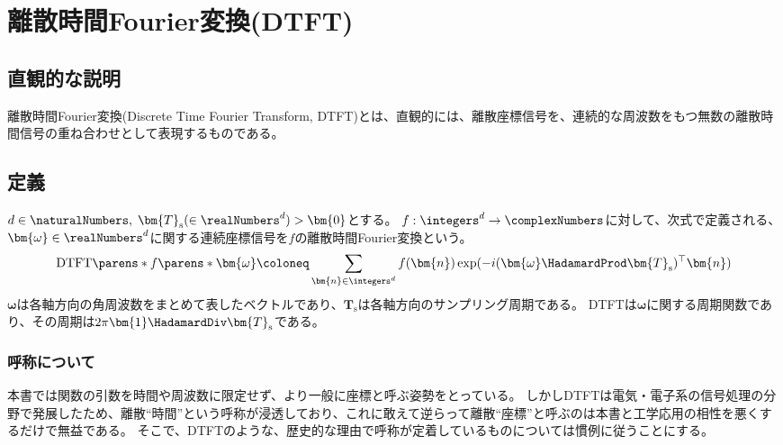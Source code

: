 \chapter{離散時間Fourier変換(DTFT)}
    \newcommand{\Ts}{T_\text{s}}
    \newcommand{\DTFT}[1]{\mathrm{DTFT}\parens*{#1}}
    \newcommand{\DTFTwithArg}[2]{\DTFT{#1}\parens*{#2}}
    \newcommand{\IDTFT}[1]{\mathrm{IDTFT}\parens*{#1}}
    \newcommand{\IDTFTwithArg}[2]{\IDTFT{#1}\parens*{#2}}
    \section{直観的な説明}
        離散時間Fourier変換(Discrete Time Fourier Transform, DTFT)とは、直観的には、離散座標信号を、連続的な周波数をもつ無数の離散時間信号の重ね合わせとして表現するものである。
    \section{定義}
        $d\in\naturalNumbers,\;\bm{T}_\text{s}(\in\realNumbers^d)>\bm{0}$とする。
        $f:\integers^d\to\complexNumbers$に対して、次式で定義される、$\bm{\omega}\in\realNumbers^d$に関する連続座標信号を$f$の離散時間Fourier変換という。
        \[ \DTFTwithArg{f}{\bm{\omega}} \coloneq \sum_{\bm{n}\in\integers^d} f(\bm{n})\exp(-i(\bm{\omega}\HadamardProd\bm{T}_\text{s})^\top\bm{n}) \]
        $\bm{\omega}$は各軸方向の角周波数をまとめて表したベクトルであり、$\bm{T}_\text{s}$は各軸方向のサンプリング周期である。
        DTFTは$\bm{\omega}$に関する周期関数であり、その周期は$2\pi\bm{1}\HadamardDiv\bm{T}_\text{s}$である。
        \subsection{呼称について}
            本書では関数の引数を時間や周波数に限定せず、より一般に座標と呼ぶ姿勢をとっている。
            しかしDTFTは電気・電子系の信号処理の分野で発展したため、離散``時間''という呼称が浸透しており、これに敢えて逆らって離散``座標''と呼ぶのは本書と工学応用の相性を悪くするだけで無益である。
            そこで、DTFTのような、歴史的な理由で呼称が定着しているものについては慣例に従うことにする。
